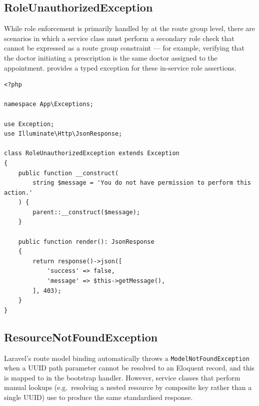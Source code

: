 \subsection{RoleUnauthorizedException}
\label{sec:ex-role-unauthorized}

While role enforcement is primarily handled by 
at the route group level, there are scenarios in which a service class
must perform a secondary role check that cannot be expressed as a route
group constraint --- for example, verifying that the doctor initiating a
prescription is the same doctor assigned to the appointment.
 provides a typed exception for
these in-service role assertions.

\begin{lstlisting}[style=php, caption={\texttt{app/Exceptions/RoleUnauthorizedException.php}.}]
<?php

namespace App\Exceptions;

use Exception;
use Illuminate\Http\JsonResponse;

class RoleUnauthorizedException extends Exception
{
    public function __construct(
        string $message = 'You do not have permission to perform this action.'
    ) {
        parent::__construct($message);
    }

    public function render(): JsonResponse
    {
        return response()->json([
            'success' => false,
            'message' => $this->getMessage(),
        ], 403);
    }
}
\end{lstlisting}

\subsection{ResourceNotFoundException}
\label{sec:ex-not-found}

Laravel's route model binding automatically throws a
\texttt{ModelNotFoundException} when a UUID path parameter cannot be
resolved to an Eloquent record, and this is mapped to \stnotfound{}
in the bootstrap handler. However, service classes that perform manual
lookups (e.g.\ resolving a nested resource by composite key rather than
a single UUID) use  to produce the
same standardised response.

